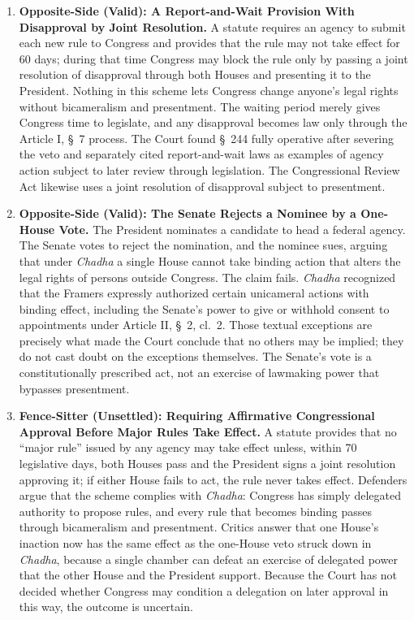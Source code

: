 \documentclass[12pt]{article}
\begin{document}
\begin{enumerate}
\item \textbf{Opposite-Side (Valid): A Report-and-Wait Provision With Disapproval by Joint Resolution.} A statute requires an agency to submit each new rule to Congress and provides that the rule may not take effect for 60 days; during that time Congress may block the rule only by passing a joint resolution of disapproval through both Houses and presenting it to the President. Nothing in this scheme lets Congress change anyone's legal rights without bicameralism and presentment. The waiting period merely gives Congress time to legislate, and any disapproval becomes law only through the Article I, \S~7 process. The Court found \S~244 fully operative after severing the veto and separately cited report-and-wait laws as examples of agency action subject to later review through legislation. The Congressional Review Act likewise uses a joint resolution of disapproval subject to presentment.

\item \textbf{Opposite-Side (Valid): The Senate Rejects a Nominee by a One-House Vote.} The President nominates a candidate to head a federal agency. The Senate votes to reject the nomination, and the nominee sues, arguing that under \textit{Chadha} a single House cannot take binding action that alters the legal rights of persons outside Congress. The claim fails. \textit{Chadha} recognized that the Framers expressly authorized certain unicameral actions with binding effect, including the Senate's power to give or withhold consent to appointments under Article II, \S~2, cl.~2. Those textual exceptions are precisely what made the Court conclude that no others may be implied; they do not cast doubt on the exceptions themselves. The Senate's vote is a constitutionally prescribed act, not an exercise of lawmaking power that bypasses presentment.

\item \textbf{Fence-Sitter (Unsettled): Requiring Affirmative Congressional Approval Before Major Rules Take Effect.} A statute provides that no ``major rule'' issued by any agency may take effect unless, within 70 legislative days, both Houses pass and the President signs a joint resolution approving it; if either House fails to act, the rule never takes effect. Defenders argue that the scheme complies with \textit{Chadha}: Congress has simply delegated authority to propose rules, and every rule that becomes binding passes through bicameralism and presentment. Critics answer that one House's inaction now has the same effect as the one-House veto struck down in \textit{Chadha}, because a single chamber can defeat an exercise of delegated power that the other House and the President support. Because the Court has not decided whether Congress may condition a delegation on later approval in this way, the outcome is uncertain.

\end{enumerate}
\end{document}
